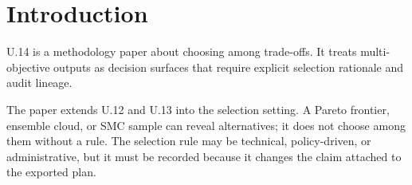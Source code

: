 \section{Introduction}

U.14 is a methodology paper about choosing among trade-offs. It treats
multi-objective outputs as decision surfaces that require explicit selection
rationale and audit lineage.

The paper extends U.12 and U.13 into the selection setting. A Pareto frontier,
ensemble cloud, or SMC sample can reveal alternatives; it does not choose among
them without a rule. The selection rule may be technical, policy-driven, or
administrative, but it must be recorded because it changes the claim attached
to the exported plan.
